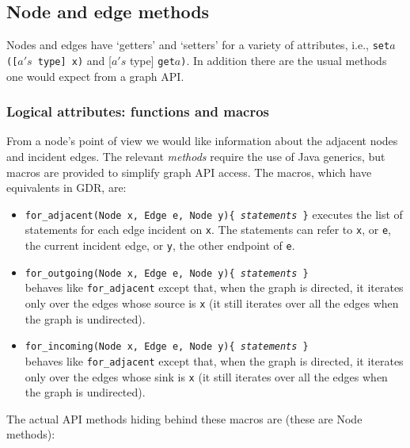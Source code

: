 
\subsection{Node and edge methods}

Nodes and edges have `getters' and `setters' for
a variety of attributes, i.e.,
\texttt{set}$a$\texttt{([$a's$ type] x)} and [$a's$ type]
\texttt{get}$a$\texttt{)}.
In addition there are the usual methods one would expect from a graph API.

\subsubsection*{Logical attributes: functions and macros}

From a node's point of view we would like information about the adjacent nodes and incident edges.
The relevant \emph{methods} require the use of Java generics, but macros are provided
to simplify graph API access. The macros, which have equivalents in GDR, are:

\begin{itemize}

\item
\texttt{for\_adjacent(Node x, Edge e, Node y)\{ \emph{statements} \}}
executes the list of statements for each edge incident on \verb$x$.
The statements can refer to \verb$x$, or \verb$e$, the current incident edge,
or \verb$y$, the other endpoint of \verb$e$.

\item
\texttt{for\_outgoing(Node x, Edge e, Node y)\{ \emph{statements} \}}\\
behaves like \texttt{for\_adjacent} except that, when the graph is directed,
it iterates only over the edges whose source is \verb$x$ (it still iterates over all the edges when the graph is undirected). 

\item
\texttt{for\_incoming(Node x, Edge e, Node y)\{ \emph{statements} \}}\\
behaves like \texttt{for\_adjacent} except that, when the graph is directed,
it iterates only over the edges whose sink is \verb$x$ (it still iterates over all the edges when the graph is undirected). 

\end{itemize}

The actual API methods hiding behind these macros are (these are Node methods):

